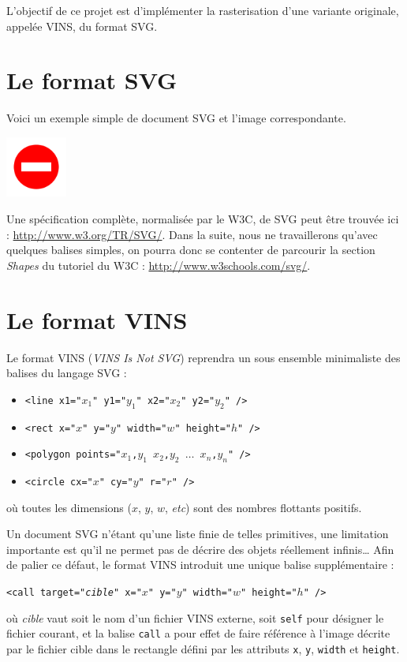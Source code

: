 \documentclass[10pt, a4paper]{article}
\begin{document}
L'objectif de ce projet est d'implémenter la rasterisation d'une
variante originale, appelée VINS, du format SVG.

\section{Le format SVG}

\noindent Voici un exemple simple de document SVG et l'image correspondante.

\begin{multicols}{2}


\hspace{4cm}\includegraphics[width=2cm]{ex0.png}
\end{multicols}

Une spécification complète, normalisée par le W3C, de SVG peut être
trouvée ici : \url{http://www.w3.org/TR/SVG/}. Dans la suite, nous ne
travaillerons qu'avec quelques balises simples, on pourra donc se
contenter de parcourir la section \emph{Shapes} du tutoriel du W3C : \url{http://www.w3schools.com/svg/}.

\section{Le format VINS}

\noindent Le format VINS (\emph{VINS Is Not SVG}) reprendra un sous ensemble
minimaliste des balises du langage SVG :
\begin{itemize}
\item \texttt{<line x1="$x_1$" y1="$y_1$" x2="$x_2$" y2="$y_2$" />}
\item \texttt{<rect x="$x$" y="$y$" width="$w$" height="$h$" />}
\item \texttt{<polygon points="$x_1$,$y_1$ $x_2$,$y_2$ $\ldots$ $x_n$,$y_n$" />}
\item \texttt{<circle cx="$x$" cy="$y$" r="$r$" />}
\end{itemize}
où toutes les dimensions ($x$, $y$, $w$, \textit{etc}) sont des nombres
flottants positifs.

Un document SVG n'étant qu'une liste finie de telles primitives, une
limitation importante est qu'il ne permet pas de décrire des objets
réellement infinis\ldots{} Afin de palier ce défaut, le format VINS introduit
une unique balise supplémentaire :
\begin{center}
\texttt{<call target="{\it cible}" x="$x$" y="$y$" width="$w$" height="$h$" />}
\end{center}
où \textit{cible} vaut soit le nom d'un fichier VINS externe,
soit \texttt{self} pour désigner le fichier courant, et la balise
\texttt{call} a pour effet de faire référence à l'image décrite par le fichier
cible dans le rectangle défini par les attributs \texttt{x}, \texttt{y}, \texttt{width} et \texttt{height}.
\end{document}
